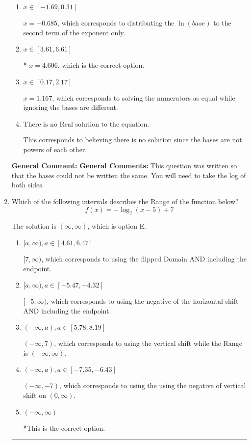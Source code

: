 \documentclass{extbook}[14pt]
\newcommand{\litem}[1]{\item #1

\rule{\textwidth}{0.4pt}}
\begin{document}
\begin{enumerate}
{\begin{enumerate}[label=\Alph*.]
$x = -7.842$, which corresponds to distributing the $\ln(base)$ to the first term of the exponent only.
\item \( x \in [-1.69, 0.31] \)

$x = -0.685$, which corresponds to distributing the $\ln(base)$ to the second term of the exponent only.
\item \( x \in [3.61, 6.61] \)

* $x = 4.606$, which is the correct option.
\item \( x \in [0.17, 2.17] \)

$x = 1.167$, which corresponds to solving the numerators as equal while ignoring the bases are different.
\item \( \text{There is no Real solution to the equation.} \)

This corresponds to believing there is no solution since the bases are not powers of each other.
\end{enumerate}

\textbf{General Comment:} \textbf{General Comments:} This question was written so that the bases could not be written the same. You will need to take the log of both sides.
}
\litem{
Which of the following intervals describes the Range of the function below?
\[ f(x) = -\log_2{(x-5)}+7 \]

The solution is \( (\infty, \infty) \), which is option E.\begin{enumerate}[label=\Alph*.]
\item \( [a, \infty), a \in [4.61, 6.47] \)

$[7, \infty)$, which corresponds to using the flipped Domain AND including the endpoint.
\item \( [a, \infty), a \in [-5.47, -4.32] \)

$[-5, \infty)$, which corresponds to using the negative of the horizontal shift AND including the endpoint.
\item \( (-\infty, a), a \in [5.78, 8.19] \)

$(-\infty, 7)$, which corresponds to using the vertical shift while the Range is $(-\infty, \infty)$.
\item \( (-\infty, a), a \in [-7.35, -6.43] \)

$(-\infty, -7)$, which corresponds to using the using the negative of vertical shift on $(0, \infty)$.
\item \( (-\infty, \infty) \)

*This is the correct option.
\end{enumerate}

}
\end{enumerate}
\end{document}
